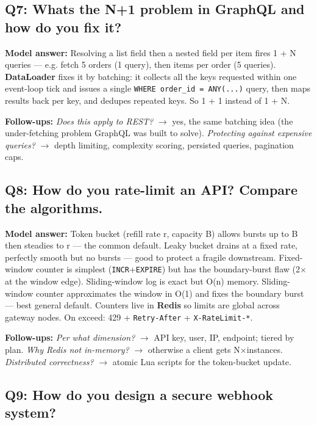 \documentclass[11pt]{article}
\begin{document}
\subsection{Q7: What\textquotesingle s the N+1 problem in GraphQL and how do you fix it?}\label{q7-whats-the-n1-problem-in-graphql-and-how-do-you-fix-it}

\textbf{Model answer:} Resolving a list field then a nested field per item fires 1 + N queries --- e.g. fetch 5 orders (1 query), then items per order (5 queries). \textbf{DataLoader} fixes it by batching: it collects all the keys requested within one event-loop tick and issues a single \texttt{WHERE\ order\_id\ =\ ANY(...)} query, then maps results back per key, and dedupes repeated keys. So 1 + 1 instead of 1 + N.

\textbf{Follow-ups:} \emph{Does this apply to REST?} \(\rightarrow\) yes, the same batching idea (the under-fetching problem GraphQL was built to solve). \emph{Protecting against expensive queries?} \(\rightarrow\) depth limiting, complexity scoring, persisted queries, pagination caps.

\subsection{Q8: How do you rate-limit an API? Compare the algorithms.}\label{q8-how-do-you-rate-limit-an-api-compare-the-algorithms}

\textbf{Model answer:} Token bucket (refill rate r, capacity B) allows bursts up to B then steadies to r --- the common default. Leaky bucket drains at a fixed rate, perfectly smooth but no bursts --- good to protect a fragile downstream. Fixed-window counter is simplest (\texttt{INCR}+\texttt{EXPIRE}) but has the boundary-burst flaw (2\(\times\) at the window edge). Sliding-window log is exact but O(n) memory. Sliding-window counter approximates the window in O(1) and fixes the boundary burst --- best general default. Counters live in \textbf{Redis} so limits are global across gateway nodes. On exceed: 429 + \texttt{Retry-After} + \texttt{X-RateLimit-*}.

\textbf{Follow-ups:} \emph{Per what dimension?} \(\rightarrow\) API key, user, IP, endpoint; tiered by plan. \emph{Why Redis not in-memory?} \(\rightarrow\) otherwise a client gets N\(\times\)instances. \emph{Distributed correctness?} \(\rightarrow\) atomic Lua scripts for the token-bucket update.

\subsection{Q9: How do you design a secure webhook system?}\label{q9-how-do-you-design-a-secure-webhook-system}
\end{document}
